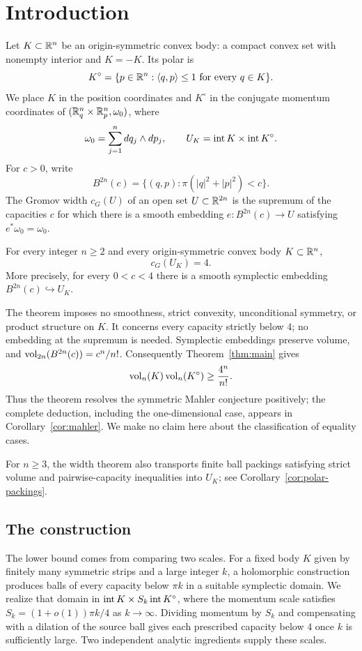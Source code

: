 \section{Introduction}\label{sec:introduction}

Let $K\subset\mathbb R^n$ be an origin-symmetric convex body: a compact convex
set with nonempty interior and $K=-K$. Its polar is
\[
 K^\circ=\{p\in\mathbb R^n:\langle q,p\rangle\le1\text{ for every }q\in K\}.
\]
We place $K$ in the position coordinates and $K^\circ$ in the conjugate
momentum coordinates of $(\mathbb R^n_q\times\mathbb R^n_p,\omega_0)$, where
\[
 \omega_0=\sum_{j=1}^n dq_j\wedge dp_j,
 \qquad U_K=\operatorname{int} K\times\operatorname{int} K^\circ.
\]
For $c>0$, write
\[
 B^{2n}(c)=\{(q,p):\pi(|q|^2+|p|^2)<c\}.
\]
The Gromov width $c_G(U)$ of an open set $U\subset\mathbb R^{2n}$ is the supremum
of the capacities $c$ for which there is a smooth embedding
$e:B^{2n}(c)\to U$ satisfying $e^*\omega_0=\omega_0$.

\begin{theorem}\label{thm:main}
For every integer $n\ge2$ and every origin-symmetric convex body
$K\subset\mathbb R^n$,
\[
 c_G(U_K)=4.
\]
More precisely, for every $0<c<4$ there is a smooth symplectic embedding
$B^{2n}(c)\hookrightarrow U_K$.
\end{theorem}

The theorem imposes no smoothness, strict convexity, unconditional
symmetry, or product structure on $K$. It concerns every capacity
strictly below $4$; no embedding at the supremum is needed.
Symplectic embeddings preserve volume, and
$\operatorname{vol}_{2n}(B^{2n}(c))=c^n/n!$. Consequently Theorem~\ref{thm:main}
gives
\[
 \operatorname{vol}_n(K)\operatorname{vol}_n(K^\circ)\ge\frac{4^n}{n!}.
\]
Thus the theorem resolves the symmetric Mahler conjecture positively;
the complete deduction, including the one-dimensional case, appears in
Corollary~\ref{cor:mahler}. We make no claim here about the classification
of equality cases.

For $n\ge3$, the width theorem also transports finite ball packings
satisfying strict volume and pairwise-capacity inequalities into $U_K$; see
Corollary~\ref{cor:polar-packings}.



\subsection*{The construction}

The lower bound comes from comparing two scales. For a fixed body $K$
given by finitely many symmetric strips and a large integer $k$, a
holomorphic construction produces balls of every capacity below $\pi k$ in a suitable symplectic
domain. We realize that domain in
$\operatorname{int} K\times S_k\operatorname{int} K^\circ$, where the momentum scale
satisfies $S_k=(1+o(1))\pi k/4$ as $k\to\infty$.
Dividing momentum by $S_k$ and compensating with a dilation of the
source ball gives each prescribed capacity below $4$ once $k$ is
sufficiently large.
Two independent analytic ingredients supply these scales.

